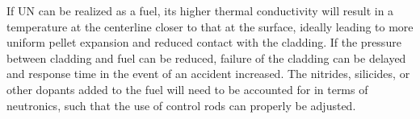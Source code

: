 \documentclass[11pt]{article}
\begin{document}
\begin{multicols}{2}
\par 
If UN can be realized as a fuel, its higher thermal conductivity will result in a temperature at the centerline closer to that at the surface, ideally leading to more uniform pellet expansion and reduced contact with the cladding. If the pressure between cladding and fuel can be reduced, failure of the cladding can be delayed and response time in the event of an accident increased. The nitrides, silicides, or other dopants added to the fuel will need to be accounted for in terms of neutronics, such that the use of control rods can properly be adjusted.

\par 





\end{multicols}
\end{document}
